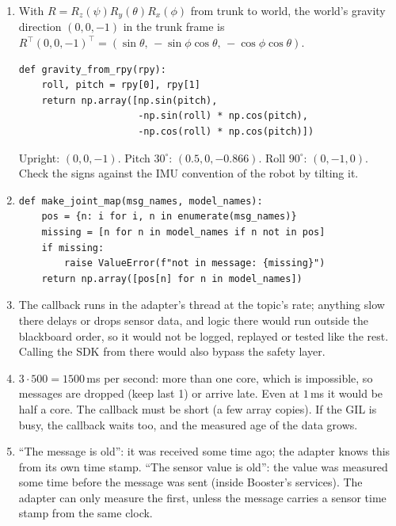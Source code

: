\begin{enumerate}[label=\textbf{\ansnum.\arabic*}]
  \item With $R=R_z(\psi)R_y(\theta)R_x(\phi)$ from trunk to world, the world's gravity direction $(0,0,-1)$ in the trunk frame is $R^\top(0,0,-1)^\top=(\sin\theta,\,-\sin\phi\cos\theta,\,-\cos\phi\cos\theta)$.
\begin{verbatim}
def gravity_from_rpy(rpy):
    roll, pitch = rpy[0], rpy[1]
    return np.array([np.sin(pitch),
                     -np.sin(roll) * np.cos(pitch),
                     -np.cos(roll) * np.cos(pitch)])
\end{verbatim}
Upright: $(0,0,-1)$. Pitch $30^\circ$: $(0.5,0,-0.866)$. Roll $90^\circ$: $(0,-1,0)$. Check the signs against the IMU convention of the robot by tilting it.
  \item
\begin{verbatim}
def make_joint_map(msg_names, model_names):
    pos = {n: i for i, n in enumerate(msg_names)}
    missing = [n for n in model_names if n not in pos]
    if missing:
        raise ValueError(f"not in message: {missing}")
    return np.array([pos[n] for n in model_names])
\end{verbatim}
  \item The callback runs in the adapter's thread at the topic's rate; anything slow there delays or drops sensor data, and logic there would run outside the blackboard order, so it would not be logged, replayed or tested like the rest. Calling the SDK from there would also bypass the safety layer.
  \item $3\cdot500=1500$\,ms per second: more than one core, which is impossible, so messages are dropped (keep last 1) or arrive late. Even at $1$\,ms it would be half a core. The callback must be short (a few array copies). If the GIL is busy, the callback waits too, and the measured age of the data grows.
  \item ``The message is old'': it was received some time ago; the adapter knows this from its own time stamp. ``The sensor value is old'': the value was measured some time before the message was sent (inside Booster's services). The adapter can only measure the first, unless the message carries a sensor time stamp from the same clock.
\end{enumerate}
